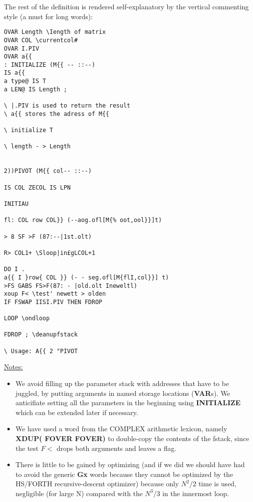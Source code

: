 The rest of the definition is rendered self-explanatory by the 
vertical commenting style (a must for long words):
\begin{verbatim}
OVAR Length \Iength of matrix
OVAR COL \currentcol#
OVAR I.PIV
OVAR a{{
: INITIALIZE (M{{ -- ::--)
IS a{{
a type@ IS T
a LEN@ IS Length ;

\ |.PIV is used to return the result
\ a{{ stores the adress of M{{

\ initialize T

\ length - > Length


2))PIVOT (M{{ col-- ::--)

IS COL ZECOL IS LPN

INITIAU

fl: COL row COL}} (--aog.ofl[M{% oot,ool}}]t)

> 8 SF >F (87:--|1st.olt)

R> COL1+ \Sloop|in£gLCOL+1

DO I .
a{{ I }row{ COL }} (- - seg.ofl[M{flI,col}}] t)
>FS GABS FS>F(87: - |old.olt Ineweltl)
xoup F< \test' newett > olden
IF FSWAP IISI.PIV THEN FDROP

LOOP \ondloop

FDROP ; \deanupfstack

\ Usage: A{{ 2 "PIVOT
\end{verbatim}

\underline{Notes:}

\begin{itemize}
  \item We avoid filling up the parameter stack with addresses that have to be
      juggled, by putting arguments in named storage locations (\textbf{VAR}s).
        We anticifiate setting all the parameters in the beginning using
        \textbf{INITIALIZE} which can be extended later if necessary.
  \item We have used a word from the COMPLEX arithmetic lexicon, namely
      \textbf{XDUP( FOVER FOVER)} to double-copy the contents of the fstack,
        since the test $F<$ drops both arguments and leaves a flag.
  \item There is little to be gained by optimizing (and if we did we should
      have had to avoid the generic \textbf{Gx} words because they cannot be optimized
        by the HS/FORTH recursive-descent optimizer) because only $N^2/2$ time
        is used, negligible (for large N) compared with the $N^3/3$ in the
        innermost loop.
\end{itemize}




